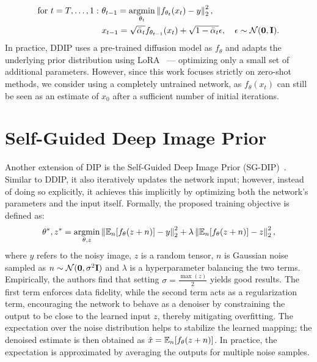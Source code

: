 \begin{align}
    \text{for}\ t=T,\dots,1:\ &\theta_{t-1} = \argmin_{\theta_t} \norm{f_{\theta_t}(x_t) - y}_2^2,\\
    &x_{t-1} = \sqrt{\bar{\alpha}_t}f_{\theta_{t-1}}(x_t) + \sqrt{1-\bar{\alpha}_t}\epsilon, \quad \epsilon \sim \unormal.
\end{align}
In practice, DDIP uses a pre-trained diffusion model as $f_\theta$ and adapts the underlying prior distribution using LoRA~\cite{LoRA} --- optimizing only a small set of additional parameters.
However, since this work focuses strictly on zero-shot methods, we consider using a completely untrained network, as $f_\theta(x_t)$ can still be seen as an estimate of $x_0$ after a sufficient number of initial iterations.


\section{Self-Guided Deep Image Prior}

Another extension of DIP is the Self-Guided Deep Image Prior (SG-DIP)~\cite{SG-DIP}.
Similar to DDIP, it also iteratively updates the network input; however, instead of doing so explicitly, it achieves this implicitly by optimizing both the network's parameters and the input itself.
Formally, the proposed training objective is defined as:
\begin{equation}
    \theta^*,z^* = \argmin_{\theta, z} \norm{\E[n]{f_\theta(z + n)} - y}_2^2 + \lambda\norm{\E[n]{f_\theta(z + n)} - z}_2^2,
\end{equation}
where $y$ refers to the noisy image, $z$ is a random tensor, $n$ is Gaussian noise sampled as $n \sim \normal$ and $\lambda$ is a hyperparameter balancing the two terms.
Empirically, the authors find that setting $\sigma = \frac{\max(z)}{2}$ yields good results.
The first term enforces data fidelity, while the second term acts as a regularization term, encouraging the network to behave as a denoiser by constraining the output to be close to the learned input $z$, thereby mitigating overfitting. 
The expectation over the noise distribution helps to stabilize the learned mapping; the denoised estimate is then obtained as $\hat{x} = \E[n]{f_\theta(z + n)}$.
In practice, the expectation is approximated by averaging the outputs for multiple noise samples.

